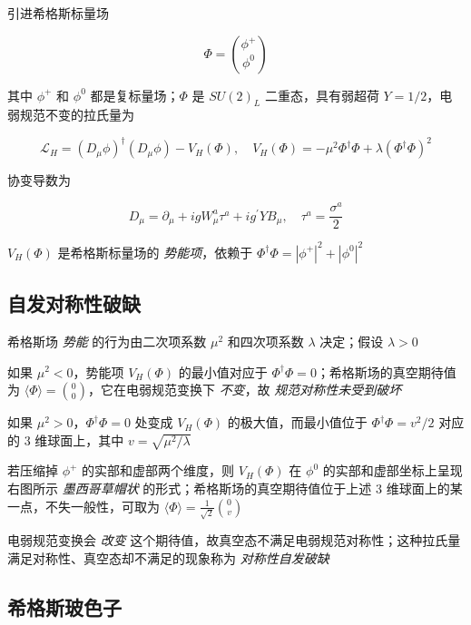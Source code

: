 \documentclass[oneside,a4paper,openany,11pt]{ctexbook}
\begin{document}
引进希格斯标量场

\begin{equation}
    \Phi = \binom{\phi^+}{\phi^0}
\end{equation}

其中 $\phi^+$ 和 $\phi^0$ 都是复标量场；$\Phi$ 是 $SU(2)_L$ 二重态，具有弱超荷 $Y=1/2$，电弱规范不变的拉氏量为

\begin{equation}
    \mathcal{L}_H = (D_\mu \phi)^\dagger (D_\mu \phi) - V_H(\Phi), \quad V_H(\Phi) = -\mu^2 \Phi^\dagger \Phi + \lambda (\Phi^\dagger \Phi)^2
\end{equation}

协变导数为

\begin{equation}
    D_\mu = \partial_\mu + ig W_\mu^a \tau^a + ig^\prime Y B_\mu, \quad \tau^a = \frac{\sigma^a}{2}
\end{equation}

$V_H(\Phi)$ 是希格斯标量场的 \emph{势能项}，依赖于 $\Phi^\dagger \Phi = |\phi^+|^2 + |\phi^0|^2$

\subsection{自发对称性破缺}

希格斯场 \emph{势能} 的行为由二次项系数 $\mu^2$ 和四次项系数 $\lambda$ 决定；假设 $\lambda > 0$

如果 $\mu^2 < 0$，势能项 $V_H(\Phi)$ 的最小值对应于 $\Phi^\dagger \Phi = 0$；希格斯场的真空期待值为 $\langle \Phi \rangle = \binom{0}{0}$，它在电弱规范变换下 \emph{不变}，故 \emph{规范对称性未受到破坏}

如果 $\mu^2 > 0$，$\Phi^\dagger \Phi = 0$ 处变成 $V_H(\Phi)$ 的极大值，而最小值位于 $\Phi^\dagger \Phi = v^2/2$ 对应的 $3$ 维球面上，其中 $v = \sqrt{\mu^2/\lambda}$

若压缩掉 $\phi^+$ 的实部和虚部两个维度，则 $V_H(\Phi)$ 在 $\phi^0$ 的实部和虚部坐标上呈现右图所示 \emph{墨西哥草帽状} 的形式；希格斯场的真空期待值位于上述 $3$ 维球面上的某一点，不失一般性，可取为 $\langle \Phi \rangle = \frac{1}{\sqrt{2}} \binom{0}{v}$

电弱规范变换会 \emph{改变} 这个期待值，故真空态不满足电弱规范对称性；这种拉氏量满足对称性、真空态却不满足的现象称为 \emph{对称性自发破缺}

\subsection{希格斯玻色子}
\end{document}
